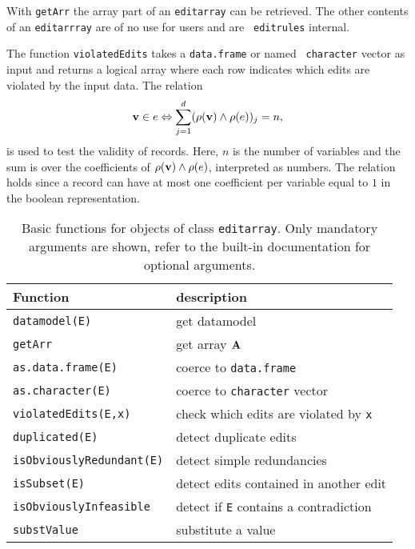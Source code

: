 \documentclass[11pt, fleqn, a4paper]{article}
\begin{document}
With {\tt getArr} the array part of an {\tt editarray} can be retrieved. The
other contents of an {\tt editarrray} are of no use for users and are {\tt
editrules} internal.

The function {\tt violatedEdits} takes a {\tt data.frame} or named {\tt
character} vector as input and returns a logical array where each row indicates
which edits are violated by the input data.
The relation 
\begin{equation}
    {\bf v}\in{e}\Leftrightarrow \sum_{j=1}^d(\rho({\bf v})\land\rho({ e}))_j = n,
    \label{eqCheckEdit}
\end{equation}
is used to test the validity of records. Here, $n$ is the number of variables
and the sum is over the coefficients of $\rho({\bf v})\land\rho({ e})$,
interpreted as numbers. The relation holds since a record can have at most one
coefficient per variable equal to $1$ in the boolean representation.




\begin{table}
\begin{threeparttable}
\caption{Basic functions for objects of class {\tt editarray}. Only mandatory
arguments are shown, refer to the built-in documentation for optional
arguments.}
\label{tabBasicfunctions}
\begin{tabular}{ll}
\hline
Function        & description \\
\hline
{\tt datamodel(E)}           & get datamodel \\
{\tt getArr}                 & get array ${\bf A}$\\
{\tt as.data.frame(E)}       & coerce to {\tt data.frame}\\
{\tt as.character(E)}        & coerce to {\tt character} vector\\
{\tt violatedEdits(E,x)}     & check which edits are violated by {\tt x}\\
{\tt duplicated(E)}          & detect duplicate edits\\
{\tt isObviouslyRedundant(E)}& detect simple redundancies\\
{\tt isSubset(E)}            & detect edits contained in another edit\\
{\tt isObviouslyInfeasible}  & detect if {\tt E} contains a contradiction\\ 
{\tt substValue}             & substitute a value\\
\hline
\end{tabular}
\end{threeparttable}
\end{table}
\end{document}
